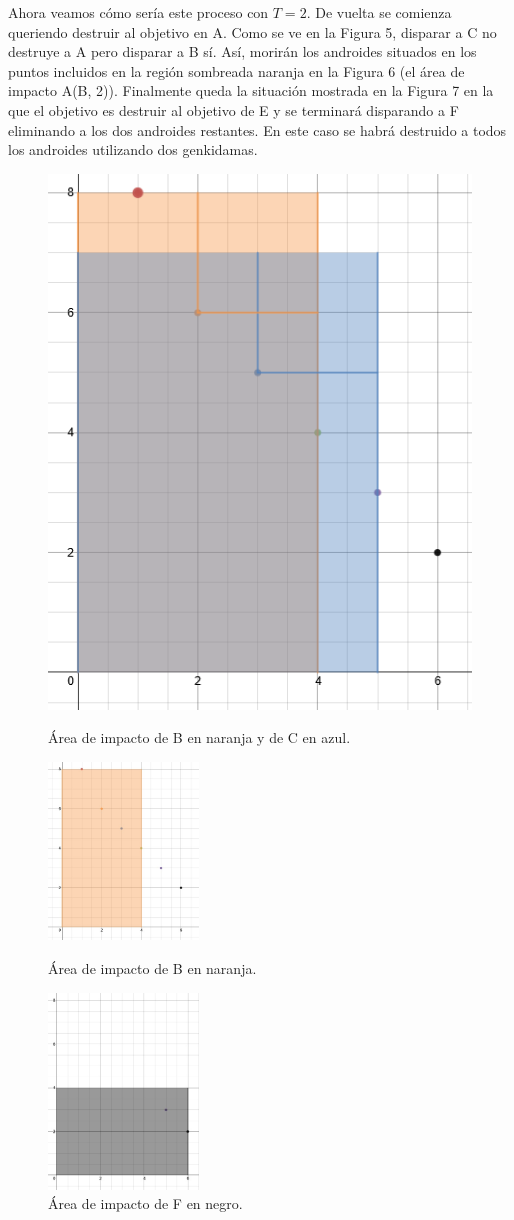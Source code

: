 \documentclass[10pt,a4paper]{article}
\begin{document}
Ahora veamos cómo sería este proceso con $T = 2$.
De vuelta se comienza queriendo destruir al objetivo en A. Como se ve en la Figura 5, disparar a C no destruye a A pero disparar a B sí. Así, morirán los androides situados en los puntos incluidos en la región sombreada naranja en la Figura 6 (el área de impacto A(B, 2)).
Finalmente queda la situación mostrada en la Figura 7 en la que el objetivo es destruir al objetivo de E y se terminará disparando a F eliminando a los dos androides restantes.
En este caso se habrá destruido a todos los androides utilizando dos genkidamas.

\begin{figure}
\centering
\begin{minipage}{.5\textwidth}
  \centering
  \includegraphics[width=.4\linewidth]{EjemploArea4}
  \caption{Área de impacto de B en naranja y de C en azul.}
  \label{fig:test1}
\end{minipage}%
\begin{minipage}{.5\textwidth}
  \centering
  \includegraphics[width=4cm]{EjemploArea5}
  \caption{Área de impacto de B en naranja.}
  \label{fig:test2}
\end{minipage}

\begin{minipage}{.5\textwidth}
  \centering
  \includegraphics[width=4cm]{EjemploArea6}
  \caption{Área de impacto de F en negro.}
  \label{fig:test2}
\end{minipage}

\end{figure}
\end{document}
